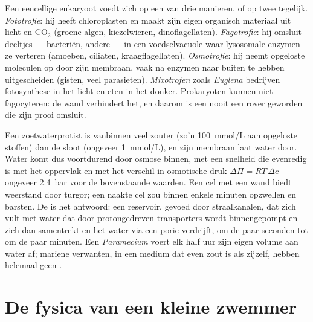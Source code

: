 \begin{definition}[Voedingswijzen]\label{def:b2:unicellular-diversity:nutrition}
Een eencellige eukaryoot voedt zich op een van drie manieren, of op
twee tegelijk. \emph{Fototrofie}: hij heeft chloroplasten en maakt zijn
eigen organisch materiaal uit licht en $\mathrm{CO_2}$ (groene algen,
kiezelwieren, dinoflagellaten). \emph{Fagotrofie}: hij omsluit deeltjes
--- bacteriën, andere  --- in een voedselvacuole waar
lysosomale enzymen ze verteren (amoeben, ciliaten, kraagflagellaten).
\emph{Osmotrofie}: hij neemt opgeloste moleculen op door zijn membraan,
vaak na enzymen naar buiten te hebben uitgescheiden (gisten, veel
parasieten). \emph{Mixotrofen} zoals \emph{Euglena} bedrijven
fotosynthese in het licht en eten in het donker. Prokaryoten kunnen
niet fagocyteren: de wand verhindert het, en daarom is een 
nooit een rover geworden die zijn prooi omsluit.
\end{definition}

\begin{proposition}\label{prop:b2:unicellular-diversity:osmoregulation}
Een zoetwaterprotist is vanbinnen veel zouter (zo'n \qty{100}{mmol/L}
aan opgeloste stoffen) dan de sloot (ongeveer \qty{1}{mmol/L}), en
zijn membraan laat water door. Water komt dus voortdurend door osmose
binnen, met een snelheid die evenredig is met het oppervlak en met het
verschil in osmotische druk $\Delta\Pi = RT\,\Delta c$ --- ongeveer
\qty{2.4}{bar} voor de bovenstaande waarden. Een cel met een wand
biedt weerstand door turgor; een naakte cel zou binnen enkele minuten
opzwellen en barsten. De \emph{} is het antwoord:
een reservoir, gevoed door straalkanalen, dat zich vult met water dat
door protongedreven transporters wordt binnengepompt en zich dan
samentrekt en het water via een porie verdrijft, om de paar seconden
tot om de paar minuten. Een \emph{Paramecium} voert elk half uur zijn
eigen volume aan water af; mariene verwanten, in een medium dat even
zout is als zijzelf, hebben helemaal geen .
\end{proposition}

\section{De fysica van een kleine zwemmer}

